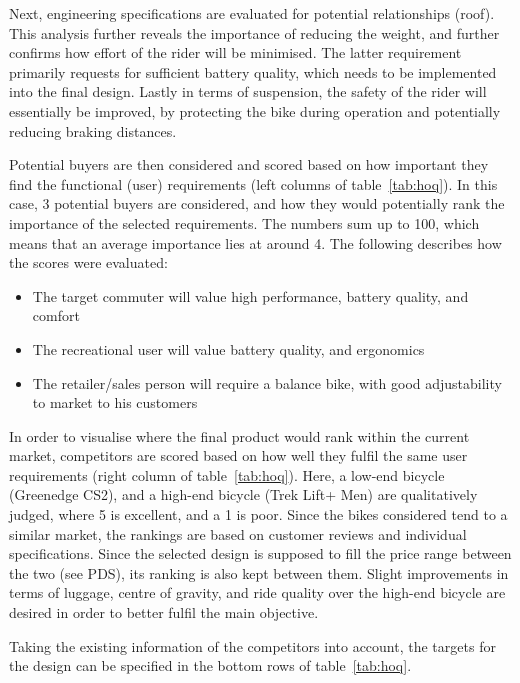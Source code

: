 \documentclass[a4paper,11pt]{article}
\begin{document}
Next, engineering specifications are evaluated for potential relationships (roof). This analysis further reveals the importance of reducing the weight, and further confirms how effort of the rider will be minimised. The latter requirement primarily requests for sufficient battery quality, which needs to be implemented into the final design. Lastly in terms of suspension, the safety of the rider will essentially be improved, by protecting the bike during operation and potentially reducing braking distances.

Potential buyers are then considered and scored based on how important they find the functional (user) requirements (left columns of table~\ref{tab:hoq}). In this case, 3 potential buyers are considered, and how they would potentially rank the importance of the selected requirements. The numbers sum up to 100, which means that an average importance lies at around 4. The following describes how the scores were evaluated:
\begin{itemize}
	\setlength{\itemsep}{0pt}
	\item The target commuter will value high performance, battery quality, and comfort
	\item The recreational user will value battery quality, and ergonomics
	\item The retailer/sales person will require a balance bike, with good adjustability to market to his customers
\end{itemize}

In order to visualise where the final product would rank within the current market, competitors are scored based on how well they fulfil the same user requirements (right column of table~\ref{tab:hoq}). Here, a low-end bicycle (Greenedge CS2), and a high-end bicycle (Trek Lift+ Men) are qualitatively judged, where 5 is excellent, and a 1 is poor. Since the bikes considered tend to a similar market, the rankings are based on customer reviews and individual specifications. Since the selected design is supposed to fill the price range between the two (see PDS), its ranking is also kept between them. Slight improvements in terms of luggage, centre of gravity, and ride quality over the high-end bicycle are desired in order to better fulfil the main objective.

Taking the existing information of the competitors into account, the targets for the design can be specified in the bottom rows of table~\ref{tab:hoq}.

\newpage
\end{document}
